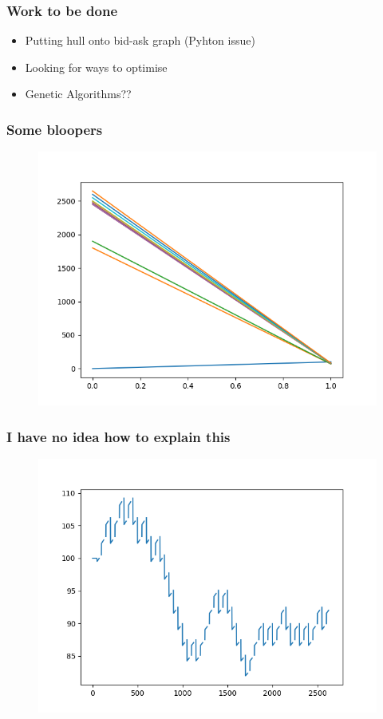 \documentclass{beamer}
\begin{document}
\begin{frame}
    \frametitle{Work to be done}
    \begin{itemize}
        \item Putting hull onto bid-ask graph (Pyhton issue)
        \pause
        \item Looking for ways to optimise
        \pause
        \item Genetic Algorithms??
    \end{itemize}
\end{frame}

\begin{frame}
    \frametitle{Some bloopers}
    \begin{figure}
        \center
        \includegraphics[scale=0.6]{../Figures/hullblooper.png}
    \end{figure}
\end{frame}

\begin{frame}
    \frametitle{I have no idea how to explain this}
        \begin{figure}
            \center
            \includegraphics[scale=0.6]{../Figures/whatonearth.png}
        \end{figure}
    \end{frame}
\end{document}
